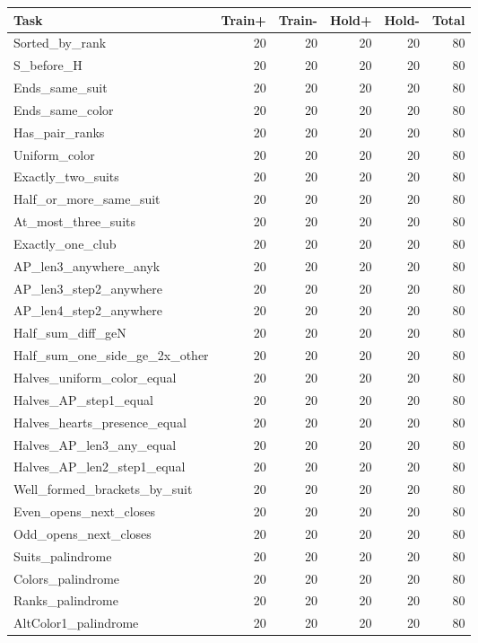 \documentclass[10pt,a4paper]{article}
\begin{document}
\begin{tabular}{lrrrrr}
\toprule
Task & Train+ & Train- & Hold+ & Hold- & Total \\
\midrule
Sorted\_by\_rank & 20 & 20 & 20 & 20 & 80 \\
S\_before\_H & 20 & 20 & 20 & 20 & 80 \\
Ends\_same\_suit & 20 & 20 & 20 & 20 & 80 \\
Ends\_same\_color & 20 & 20 & 20 & 20 & 80 \\
Has\_pair\_ranks & 20 & 20 & 20 & 20 & 80 \\
Uniform\_color & 20 & 20 & 20 & 20 & 80 \\
Exactly\_two\_suits & 20 & 20 & 20 & 20 & 80 \\
Half\_or\_more\_same\_suit & 20 & 20 & 20 & 20 & 80 \\
At\_most\_three\_suits & 20 & 20 & 20 & 20 & 80 \\
Exactly\_one\_club & 20 & 20 & 20 & 20 & 80 \\
AP\_len3\_anywhere\_anyk & 20 & 20 & 20 & 20 & 80 \\
AP\_len3\_step2\_anywhere & 20 & 20 & 20 & 20 & 80 \\
AP\_len4\_step2\_anywhere & 20 & 20 & 20 & 20 & 80 \\
Half\_sum\_diff\_geN & 20 & 20 & 20 & 20 & 80 \\
Half\_sum\_one\_side\_ge\_2x\_other & 20 & 20 & 20 & 20 & 80 \\
Halves\_uniform\_color\_equal & 20 & 20 & 20 & 20 & 80 \\
Halves\_AP\_step1\_equal & 20 & 20 & 20 & 20 & 80 \\
Halves\_hearts\_presence\_equal & 20 & 20 & 20 & 20 & 80 \\
Halves\_AP\_len3\_any\_equal & 20 & 20 & 20 & 20 & 80 \\
Halves\_AP\_len2\_step1\_equal & 20 & 20 & 20 & 20 & 80 \\
Well\_formed\_brackets\_by\_suit & 20 & 20 & 20 & 20 & 80 \\
Even\_opens\_next\_closes & 20 & 20 & 20 & 20 & 80 \\
Odd\_opens\_next\_closes & 20 & 20 & 20 & 20 & 80 \\
Suits\_palindrome & 20 & 20 & 20 & 20 & 80 \\
Colors\_palindrome & 20 & 20 & 20 & 20 & 80 \\
Ranks\_palindrome & 20 & 20 & 20 & 20 & 80 \\
AltColor1\_palindrome & 20 & 20 & 20 & 20 & 80 \\

\end{tabular}
\end{document}
